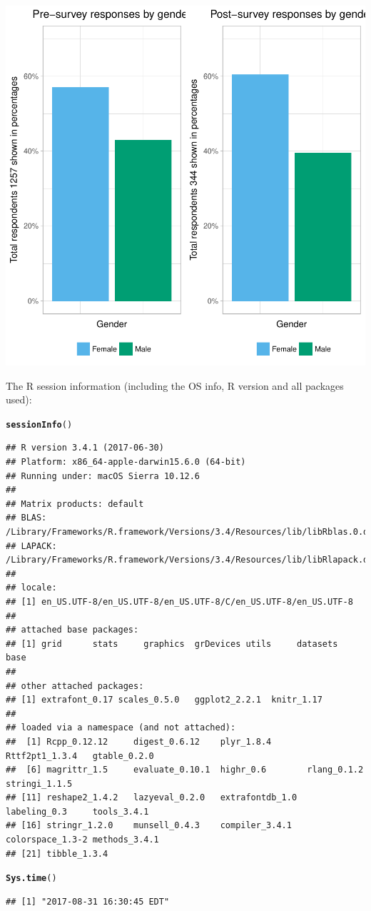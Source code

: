 \documentclass{article}\usepackage[]{graphicx}\usepackage[]{color}
\makeatletter
\newcommand{\hlstd}[1]{\textcolor[rgb]{0.345,0.345,0.345}{#1}}%
\newcommand{\hlkwd}[1]{\textcolor[rgb]{0.737,0.353,0.396}{\textbf{#1}}}%
\newenvironment{kframe}{%
 \def\at@end@of@kframe{}%
 \ifinner\ifhmode%
  \def\at@end@of@kframe{\end{minipage}}%
  \begin{minipage}{\columnwidth}%
 \fi\fi%
 \def\FrameCommand##1{\hskip\@totalleftmargin \hskip-\fboxsep
 \colorbox{shadecolor}{##1}\hskip-\fboxsep
     \hskip-\linewidth \hskip-\@totalleftmargin \hskip\columnwidth}%
 \MakeFramed {\advance\hsize-\width
   \@totalleftmargin\z@ \linewidth\hsize
   \@setminipage}}%
 {\par\unskip\endMakeFramed%
 \at@end@of@kframe}
\newenvironment{knitrout}{}{} %
\makeatother
\begin{document}
\begin{knitrout}
{\centering \includegraphics[width=.6\linewidth]{figure/calls-Rnwplotting-pre-postsurvey-dataUS-6} 

}



\end{knitrout}

The R session information (including the OS info, R version and all
packages used):

\begin{knitrout}
\color{fgcolor}\begin{kframe}
\begin{alltt}
\hlkwd{sessionInfo}\hlstd{()}
\end{alltt}
\begin{verbatim}
## R version 3.4.1 (2017-06-30)
## Platform: x86_64-apple-darwin15.6.0 (64-bit)
## Running under: macOS Sierra 10.12.6
## 
## Matrix products: default
## BLAS: /Library/Frameworks/R.framework/Versions/3.4/Resources/lib/libRblas.0.dylib
## LAPACK: /Library/Frameworks/R.framework/Versions/3.4/Resources/lib/libRlapack.dylib
## 
## locale:
## [1] en_US.UTF-8/en_US.UTF-8/en_US.UTF-8/C/en_US.UTF-8/en_US.UTF-8
## 
## attached base packages:
## [1] grid      stats     graphics  grDevices utils     datasets  base     
## 
## other attached packages:
## [1] extrafont_0.17 scales_0.5.0   ggplot2_2.2.1  knitr_1.17    
## 
## loaded via a namespace (and not attached):
##  [1] Rcpp_0.12.12     digest_0.6.12    plyr_1.8.4       Rttf2pt1_1.3.4   gtable_0.2.0    
##  [6] magrittr_1.5     evaluate_0.10.1  highr_0.6        rlang_0.1.2      stringi_1.1.5   
## [11] reshape2_1.4.2   lazyeval_0.2.0   extrafontdb_1.0  labeling_0.3     tools_3.4.1     
## [16] stringr_1.2.0    munsell_0.4.3    compiler_3.4.1   colorspace_1.3-2 methods_3.4.1   
## [21] tibble_1.3.4
\end{verbatim}
\begin{alltt}
\hlkwd{Sys.time}\hlstd{()}
\end{alltt}
\begin{verbatim}
## [1] "2017-08-31 16:30:45 EDT"
\end{verbatim}
\end{kframe}
\end{knitrout}
\end{document}
